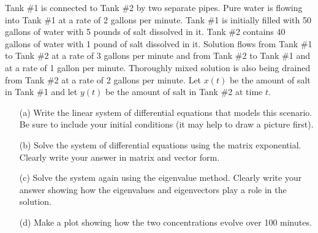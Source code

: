 \begin{problem}
    Tank \#1 is connected to Tank \#2 by two separate pipes.  Pure water is flowing
    into Tank \#1 at a rate of 2 gallons per minute.  Tank \#1 is initially filled with 50
    gallons of water with 5 pounds of salt dissolved in it.  Tank \#2 contains 40 gallons
    of water with 1 pound of salt dissolved in it.  Solution flows from Tank \#1 to Tank
    \#2 at a rate of 3 gallons per minute and from Tank \#2 to Tank \#1 and at a rate of 1
    gallon per minute.  Thoroughly mixed solution is also being drained from Tank \#2 at a
    rate of 2 gallons per minute.  Let $x(t)$ be the amount of salt in Tank \#1 and let
    $y(t)$ be the amount of salt in Tank \#2 at time $t$.  
    \begin{enumerate}
        \item[(a)] Write the linear system of differential equations that models this
            scenario. Be sure to include your initial conditions (it may help to draw a
            picture first).
        \item[(b)] Solve the system of differential equations using the matrix
            exponential.  Clearly write your answer in matrix and  vector form.
        \item[(c)] Solve the system again using the eigenvalue method.  Clearly write your
            answer showing how the eigenvalues and eigenvectors play a role in the
            solution.
        \item[(d)] Make a plot showing how the two concentrations evolve over 100 minutes.
    \end{enumerate}
\end{problem}




